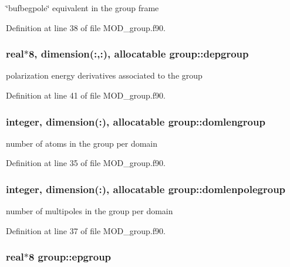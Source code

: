 \char`\"{}bufbegpole\char`\"{} equivalent in the group frame 



Definition at line 38 of file M\-O\-D\-\_\-group.\-f90.

\hypertarget{classgroup_a72ba92e2b0de980278647c3fa93e6f89}{
\subsubsection[{depgroup}]{\setlength{\rightskip}{0pt plus 5cm}real$\ast$8, dimension(\-:,\-:), allocatable group\-::depgroup}}\label{classgroup_a72ba92e2b0de980278647c3fa93e6f89}


polarization energy derivatives associated to the group 



Definition at line 41 of file M\-O\-D\-\_\-group.\-f90.

\hypertarget{classgroup_a9d836ef816d6142460acb09ffd014c39}{
\subsubsection[{domlengroup}]{\setlength{\rightskip}{0pt plus 5cm}integer, dimension(\-:), allocatable group\-::domlengroup}}\label{classgroup_a9d836ef816d6142460acb09ffd014c39}


number of atoms in the group per domain 



Definition at line 35 of file M\-O\-D\-\_\-group.\-f90.

\hypertarget{classgroup_abccd8ee5026fe4c409268a0384ee21bc}{
\subsubsection[{domlenpolegroup}]{\setlength{\rightskip}{0pt plus 5cm}integer, dimension(\-:), allocatable group\-::domlenpolegroup}}\label{classgroup_abccd8ee5026fe4c409268a0384ee21bc}


number of multipoles in the group per domain 



Definition at line 37 of file M\-O\-D\-\_\-group.\-f90.

\hypertarget{classgroup_a80e207afd9b26323fa408c4f4c233767}{
\subsubsection[{epgroup}]{\setlength{\rightskip}{0pt plus 5cm}real$\ast$8 group\-::epgroup}}\label{classgroup_a80e207afd9b26323fa408c4f4c233767}


